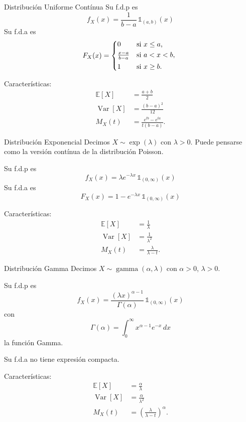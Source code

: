 \documentclass[a4paper]{article}
\theoremstyle{mytheoremstyle}
\newcommand{\E}{\mathbb{E}}
\newcommand{\1}{\mathds{1}}
\DeclareMathOperator{\Var}{Var}
\DeclareMathOperator{\dgamma}{gamma}
\begin{document}
\begin{multicols*}{3}
\begin{roundbox}{Distribución Uniforme Contínua}
    Su f.d.p es 
    \[
        f_X(x) = \frac{1}{b-a} \, \1_{(a,b)}(x)
    \]
    Su f.d.a es 
    \[
        F_X (x) = 
        \begin{cases*}
            0 & si $x \leq a$, \\
            \frac{x-a}{b-a} & si $a < x <b$, \\
            1 & si $x \geq b$.
        \end{cases*}  
    \]

    Características:
    \begin{align*}
        \E[X] &= \frac{a+b}{2} \\
        \Var[X] &= \frac{(b-a)^{2}}{12} \\
        M_X(t) &= \frac{e^{tb} - e^{ta}}{t(b-a)}.
    \end{align*}
\end{roundbox}

\begin{roundbox}{Distribución Exponencial}
    Decimos $X \sim \exp(\lambda)$ con $\lambda>0$.
    Puede pensarse como la versión contínua de la distribución Poisson.

    Su f.d.p es 
    \[
        f_X(x) = \lambda e^{-\lambda x} \, \1_{(0,\infty)}(x)
    \]
    Su f.d.a es 
    \[
        F_X (x) = 1 - e^{-\lambda x} \, \1_{(0,\infty)}(x)
    \]

    Características:
    \begin{align*}
        \E[X] &= \frac{1}{\lambda} \\
        \Var[X] &= \frac{1}{\lambda^2} \\
        M_X(t) &= \frac{\lambda}{\lambda - t}.
    \end{align*}
\end{roundbox}

\begin{roundbox}{Distribución Gamma}
    Decimos $X \sim \dgamma(\alpha, \lambda)$ con $\alpha > 0$, $\lambda>0$.

    Su f.d.p es 
    \[
        f_X(x) = \frac{(\lambda x)^{\alpha -1}}{\Gamma(\alpha)} \, \1_{(0,\infty)}(x)
    \]
    con 
    \[
        \Gamma(\alpha) = \int_{0}^{\infty} x^{\alpha-1} e^{-x} \, dx
    \]
    la función Gamma.

    Su f.d.a no tiene expresión compacta.

    Características:
    \begin{align*}
        \E[X] &= \frac{\alpha}{\lambda} \\
        \Var[X] &= \frac{\alpha}{\lambda^2} \\
        M_X(t) &= \left( \frac{\lambda}{\lambda -t} \right)^{\alpha}.
    \end{align*}
\end{roundbox}


\end{multicols*}
\end{document}
